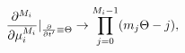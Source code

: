\begin{equation}
\label{eq:Thder2}
{\partial^{M_i}\over\partial\mu_i^{M_i}}|_{{\partial\over\partial t^\prime}
\equiv\Theta}\rightarrow\prod_{j=0}^{M_i-1}(m_j\Theta - j),
\end{equation}

